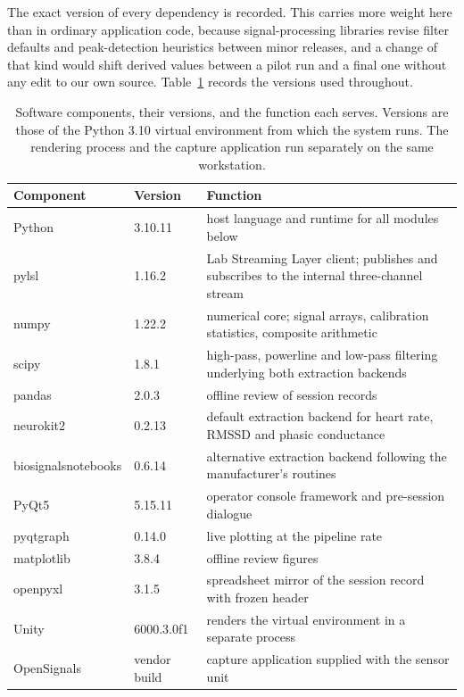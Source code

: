 The exact version of every dependency is recorded. This carries
more weight here than in ordinary application code, because
signal-processing libraries revise filter defaults and
peak-detection heuristics between minor releases, and a change of
that kind would shift derived values between a pilot run and a
final one without any edit to our own source.
Table~\ref{tab:versions} records the versions used throughout.

\begin{table}[H]
    \centering
    \renewcommand{\arraystretch}{1.4}
    \setlength{\tabcolsep}{10pt}
    \small
    \begin{tabular}{@{}p{3.0cm}p{2.0cm}p{8.0cm}@{}}
        \toprule
        \textbf{Component} &
        \textbf{Version} &
        \textbf{Function} \\
        \midrule
        Python & 3.10.11 & host language and runtime for all modules below \\
        \addlinespace[4pt]
        pylsl & 1.16.2 & Lab Streaming Layer client; publishes and subscribes to the internal three-channel stream \\
        \addlinespace[4pt]
        numpy & 1.22.2 & numerical core; signal arrays, calibration statistics, composite arithmetic \\
        \addlinespace[4pt]
        scipy & 1.8.1 & high-pass, powerline and low-pass filtering underlying both extraction backends \\
        \addlinespace[4pt]
        pandas & 2.0.3 & offline review of session records \\
        \addlinespace[4pt]
        neurokit2 & 0.2.13 & default extraction backend for heart rate, RMSSD and phasic conductance \\
        \addlinespace[4pt]
        biosignalsnotebooks & 0.6.14 & alternative extraction backend following the manufacturer's routines \\
        \addlinespace[4pt]
        PyQt5 & 5.15.11 & operator console framework and pre-session dialogue \\
        \addlinespace[4pt]
        pyqtgraph & 0.14.0 & live plotting at the pipeline rate \\
        \addlinespace[4pt]
        matplotlib & 3.8.4 & offline review figures \\
        \addlinespace[4pt]
        openpyxl & 3.1.5 & spreadsheet mirror of the session record with frozen header \\
        \addlinespace[4pt]
        Unity & 6000.3.0f1 & renders the virtual environment in a separate process \\
        \addlinespace[4pt]
        OpenSignals & vendor build & capture application supplied with the sensor unit \\
        \bottomrule
    \end{tabular}
    \caption{Software components, their versions, and the function
    each serves. Versions are those of the Python 3.10 virtual
    environment from which the system runs. The rendering process
    and the capture application run separately on the same
    workstation.}
    \label{tab:versions}
\end{table}

